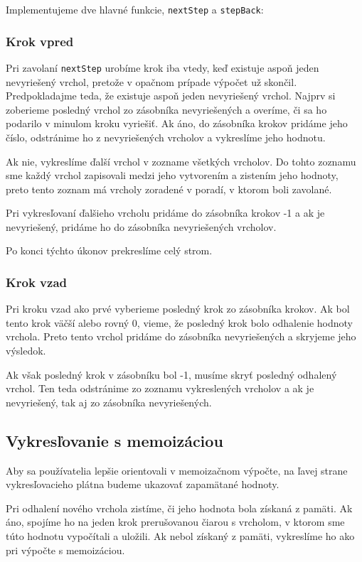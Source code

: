 Implementujeme dve hlavné funkcie, \lstinline[language=Javascript]{nextStep} a
\lstinline[language=Javascript]{stepBack}:
\subsubsection{Krok vpred}
Pri zavolaní \lstinline[language=Javascript]{nextStep} urobíme krok iba vtedy,
keď existuje aspoň jeden nevyriešený vrchol, pretože v opačnom prípade výpočet už skončil.
Predpokladajme teda, že existuje aspoň jeden nevyriešený vrchol. Najprv si zoberieme
posledný vrchol zo zásobníka nevyriešených a overíme, či sa ho podarilo v minulom kroku vyriešiť.
Ak áno, do zásobníka krokov pridáme jeho číslo, odstránime ho z nevyriešených vrcholov a
vykreslíme jeho hodnotu.

Ak nie, vykreslíme ďalší vrchol v zozname všetkých vrcholov. Do tohto zoznamu sme
každý vrchol zapisovali medzi jeho vytvorením a zistením jeho hodnoty, preto
tento zoznam má vrcholy zoradené v poradí, v ktorom boli zavolané.

Pri vykresľovaní ďalšieho vrcholu pridáme do zásobníka krokov -1 a ak je nevyriešený,
pridáme ho do zásobníka nevyriešených vrcholov.

Po konci týchto úkonov prekreslíme celý strom.
\subsubsection{Krok vzad}
Pri kroku vzad ako prvé vyberieme posledný krok zo zásobníka krokov. Ak bol tento
krok väčší alebo rovný 0, vieme, že posledný krok bolo odhalenie hodnoty vrchola.
Preto tento vrchol pridáme do zásobníka nevyriešených a skryjeme jeho výsledok.

Ak však posledný krok v zásobníku bol -1, musíme skryť posledný odhalený vrchol.
Ten teda odstránime zo zoznamu vykreslených vrcholov a ak je nevyriešený, tak aj
zo zásobníka nevyriešených.
\subsection{Vykresľovanie s memoizáciou}
Aby sa používatelia lepšie orientovali v memoizačnom výpočte, na ľavej strane
vykresľovacieho plátna budeme ukazovať zapamätané hodnoty.

Pri odhalení nového vrchola zistíme, či jeho hodnota bola získaná z pamäti.
Ak áno, spojíme ho na jeden krok prerušovanou
čiarou s vrcholom, v ktorom sme túto hodnotu vypočítali a uložili. Ak nebol získaný
z pamäti, vykreslíme ho ako pri výpočte s memoizáciou.

